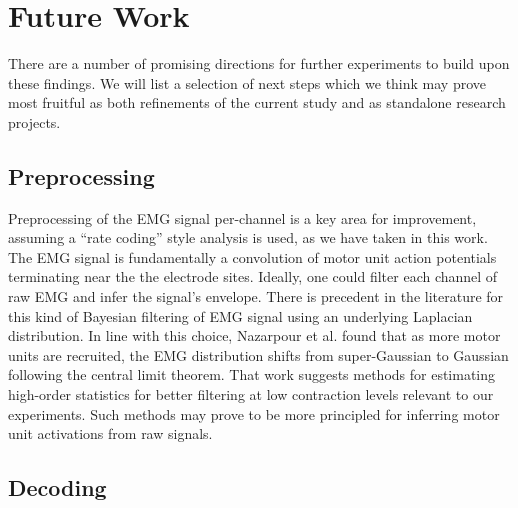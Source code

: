 \documentclass[../main.tex]{subfiles}
\begin{document}
\section{Future Work} %

There are a number of promising directions for further experiments to build upon these findings. We will list a selection of next steps which we think may prove most fruitful as both refinements of the current study and as standalone research projects.



\subsection{Preprocessing}

Preprocessing of the EMG signal per-channel is a key area for improvement, assuming a ``rate coding'' style analysis is used, as we have taken in this work. The EMG signal is fundamentally a convolution of motor unit action potentials terminating near the the electrode sites. Ideally, one could filter each channel of raw EMG and infer the signal's envelope. There is precedent in the literature for this kind of Bayesian filtering of EMG signal using an underlying Laplacian distribution\cite{sangerBayesianFilteringMyoelectric2007}. In line with this choice, Nazarpour et al. found that as more motor units are recruited, the EMG distribution shifts from super-Gaussian to Gaussian following the central limit theorem\cite{nazarpourNoteProbabilityDistribution2013}. That work suggests methods for estimating high-order statistics for better filtering at low contraction levels relevant to our experiments. Such methods may prove to be more principled for inferring motor unit activations from raw signals.



\subsection{Decoding}
\end{document}
